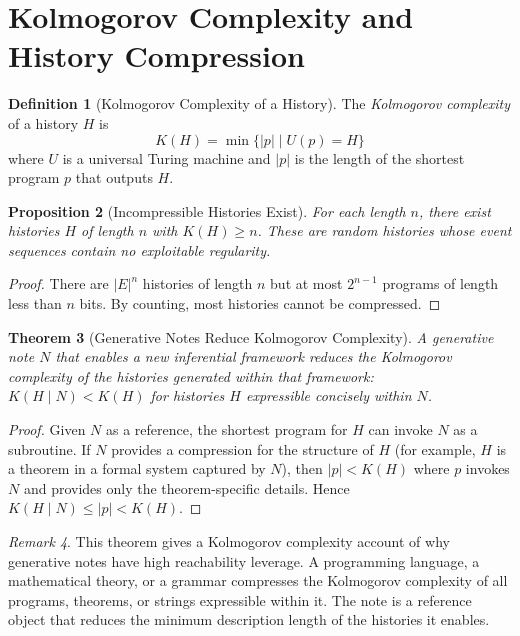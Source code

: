 \documentclass[12pt, a4paper, openany]{book}
\theoremstyle{plain}
\newtheorem{theorem}{Theorem}[chapter]
\newtheorem{proposition}[theorem]{Proposition}
\theoremstyle{definition}
\newtheorem{definition}[theorem]{Definition}
\theoremstyle{remark}
\newtheorem{remark}[theorem]{Remark}
\begin{document}
\section{Kolmogorov Complexity and History Compression}

\begin{definition}[Kolmogorov Complexity of a History]
The \emph{Kolmogorov complexity} of a history $H$ is
\[
K(H) = \min\{|p| \mid U(p) = H\}
\]
where $U$ is a universal Turing machine and $|p|$ is the length of the shortest
program $p$ that outputs $H$.
\end{definition}

\begin{proposition}[Incompressible Histories Exist]
For each length $n$, there exist histories $H$ of length $n$ with $K(H) \geq n$.
These are \emph{random histories} whose event sequences contain no exploitable
regularity.
\end{proposition}

\begin{proof}
There are $|E|^n$ histories of length $n$ but at most $2^{n-1}$ programs of
length less than $n$ bits. By counting, most histories cannot be compressed.
\end{proof}

\begin{theorem}[Generative Notes Reduce Kolmogorov Complexity]
A generative note $N$ that enables a new inferential framework reduces the
Kolmogorov complexity of the histories generated within that framework:
$K(H \mid N) < K(H)$ for histories $H$ expressible concisely within $N$.
\end{theorem}

\begin{proof}
Given $N$ as a reference, the shortest program for $H$ can invoke $N$ as a
subroutine. If $N$ provides a compression for the structure of $H$ (for
example, $H$ is a theorem in a formal system captured by $N$), then
$|p| < K(H)$ where $p$ invokes $N$ and provides only the theorem-specific
details. Hence $K(H \mid N) \leq |p| < K(H)$.
\end{proof}

\begin{remark}
This theorem gives a Kolmogorov complexity account of why generative notes
have high reachability leverage. A programming language, a mathematical theory,
or a grammar compresses the Kolmogorov complexity of all programs, theorems,
or strings expressible within it. The note is a reference object that reduces
the minimum description length of the histories it enables.
\end{remark}
\end{document}
